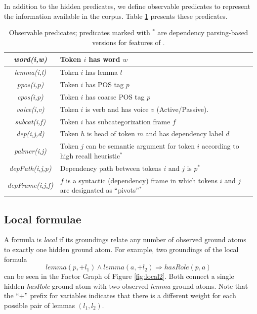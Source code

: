 In addition to the hidden predicates, we define observable predicates to
represent the information available in the corpus. Table \ref{tbl:o_preds}
presents these predicates. 
\begin{table}
    \small
    \centering
    \begin{tabular}{|c|p{4.5cm}|}
        \hline
    \emph{word(i,w)}    & Token $i$ has word $w$\\\hline
    \emph{lemma(i,l)}   & Token $i$ has lemma $l$\\\hline
    \emph{ppos(i,p)}    & Token $i$ has POS tag $p$\\\hline
    \emph{cpos(i,p)}    & Token $i$ has coarse POS tag $p$\\\hline
    \emph{voice(i,v)}   & Token $i$ is verb and has voice $v$ (Active/Passive).\\\hline
    \emph{subcat(i,f)} & Token $i$ has subcategorization frame $f$\\\hline\hline
    \emph{dep(i,j,d)}     & Token $h$ is head of token $m$ and has dependency label $d$\\\hline
    \emph{palmer(i,j)}  & Token $j$ can be semantic argument for token $i$ according to high recall heuristic$^*$\\\hline
    \emph{depPath(i,j,p)}      & Dependency path between tokens $i$ and $j$ is $p$$^*$\\\hline
    \emph{depFrame(i,j,f)}     & $f$ is a syntactic (dependency) frame in which tokens $i$ and $j$ are designated as ``pivots''$^*$\\\hline
    \end{tabular}
    \caption{Observable predicates; predicates marked with $^*$ are dependency parsing-based versions for features of \citet{xue04calibrating}.}
    \label{tbl:o_preds}
\end{table}


\subsection{Local formulae}
\label{sec:local}

A formula is \emph{local} if its groundings relate any number of observed ground atoms to exactly one hidden ground atom. For example, two groundings of the local formula 
\[lemma(p,+l_1) \wedge lemma(a,+l_2) \Rightarrow hasRole(p,a)\]
can be seen in the Factor Graph of Figure \ref{fig:local2}. Both connect a single  hidden \emph{hasRole} ground atom with two observed \emph{lemma} ground atoms. Note that the ``+'' prefix for variables indicates that there is a different weight for each possible pair of lemmas $(l_1,l_2)$.

